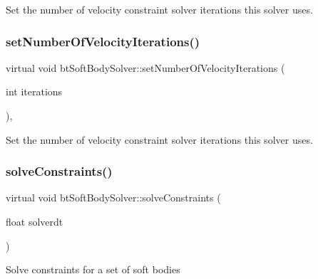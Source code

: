 Set the number of velocity constraint solver iterations this solver uses. \mbox{\label{classbtSoftBodySolver_a48b281048407640c73bfd355125a55e5}} 
\subsubsection{\texorpdfstring{set\+Number\+Of\+Velocity\+Iterations()}{setNumberOfVelocityIterations()}}
{\footnotesize\ttfamily virtual void bt\+Soft\+Body\+Solver\+::set\+Number\+Of\+Velocity\+Iterations (\begin{DoxyParamCaption}\item[{int}]{iterations }\end{DoxyParamCaption})\hspace{0.3cm}{\ttfamily [inline]}, {\ttfamily [virtual]}}

Set the number of velocity constraint solver iterations this solver uses. \mbox{\label{classbtSoftBodySolver_a5e71a2a32786574bedf409ba822980eb}} 
\subsubsection{\texorpdfstring{solve\+Constraints()}{solveConstraints()}}
{\footnotesize\ttfamily virtual void bt\+Soft\+Body\+Solver\+::solve\+Constraints (\begin{DoxyParamCaption}\item[{float}]{solverdt }\end{DoxyParamCaption})\hspace{0.3cm}{\ttfamily [pure virtual]}}

Solve constraints for a set of soft bodies 

